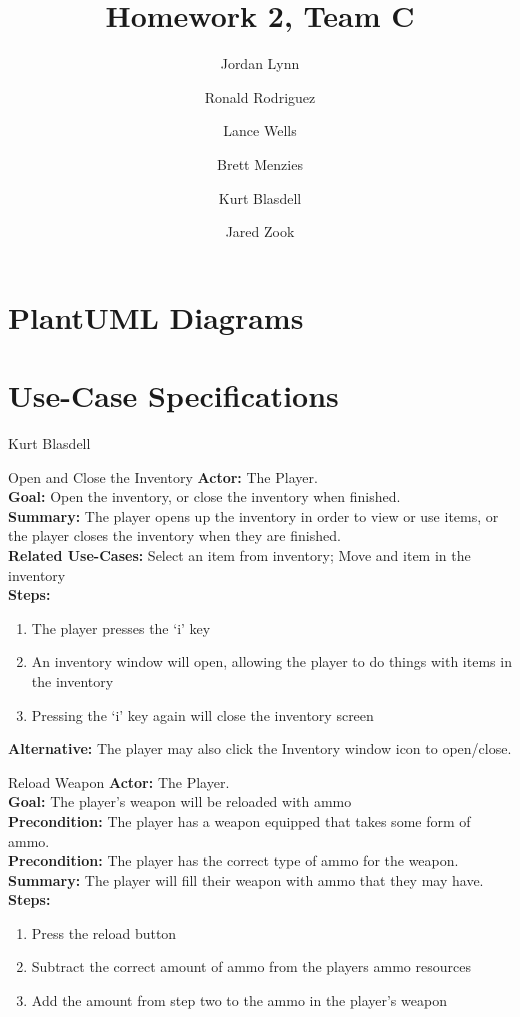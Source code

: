 \documentclass[12pt]{report}
\title{Homework 2, Team C}
\author{ Jordan Lynn 
\and Ronald Rodriguez 
\and Lance Wells 
\and Brett Menzies 
\and Kurt Blasdell 
\and Jared Zook 
\and
}
\begin{document}
    \maketitle

\tableofcontents{}

\chapter{PlantUML Diagrams}

\chapter{Use-Case Specifications}


\begin{section}{Kurt Blasdell}
\begin{subsection}{Open and Close the Inventory}
\textbf{Actor:} The Player. \\
\textbf{Goal:} Open the inventory, or close the inventory when finished. \\
\textbf{Summary:} The player opens up the inventory in order to view or use items, or the player closes the inventory when they are finished. \\
\textbf{Related Use-Cases:} Select an item from inventory; Move and item in the inventory \\
\textbf{Steps:}
\begin{enumerate}
	\item The player presses the ‘i’ key
	\item An inventory window will open, allowing the player to do things with items in the inventory
	\item Pressing the ‘i’ key again will close the inventory screen
\end{enumerate}
\textbf{Alternative:} The player may also click the Inventory window icon to open/close.
\end{subsection}

\begin{subsection}{Reload Weapon}
\textbf{Actor:} The Player. \\
\textbf{Goal:} The player’s weapon will be reloaded with ammo \\
\textbf{Precondition:} The player has a weapon equipped that takes some form of ammo. \\
\textbf{Precondition:} The player has the correct type of ammo for the weapon. \\
\textbf{Summary:} The player will fill their weapon with ammo that they may have. \\
\textbf{Steps:}
\begin{enumerate}
	\item Press the reload button
	\item Subtract the correct amount of ammo from the players ammo resources
	\item Add the amount from step two to the ammo in the player’s weapon
\end{enumerate}
\end{subsection}


\end{section}
\end{document}
